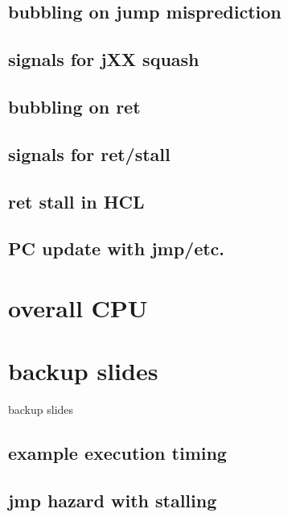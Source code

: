 \subsection{bubbling on jump misprediction}


\subsection{signals for jXX squash}


\subsection{bubbling on ret}



\subsection{signals for ret/stall}


\subsection{ret stall in HCL}


\subsection{PC update with jmp/etc.}


\section{overall CPU}



\section{backup slides}
\begin{frame}{backup slides}
\end{frame}

\subsection{example execution timing}


\subsection{jmp hazard with stalling}


